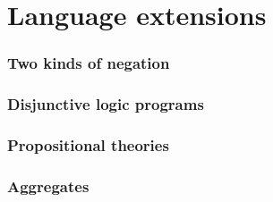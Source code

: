 \part{Language extensions}
\section{Two kinds of negation}

\section{Disjunctive logic programs}

\section{Propositional theories}

\section{Aggregates}

%
